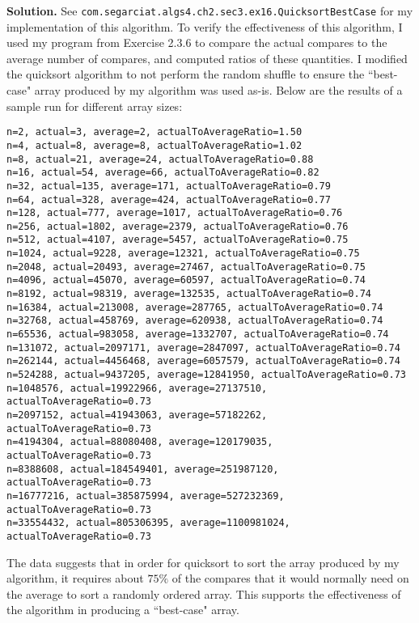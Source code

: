 \documentclass[12pt, a4paper]{article}
\newenvironment{sol}[1][Solution]
{\par\medskip\noindent \textbf{#1.} }
{\medskip}
\begin{document}
\begin{sol}
		See \texttt{com.segarciat.algs4.ch2.sec3.ex16.QuicksortBestCase} for my implementation
		of this algorithm. To verify the effectiveness of this algorithm, I used
		my program from Exercise 2.3.6 to compare the actual compares to the average
		number of compares, and computed ratios of these quantities. I modified the
		quicksort algorithm to not perform the random shuffle to ensure the ``best-case"
		array produced by my algorithm was used as-is. Below are the results of a sample
		run for different array sizes:
		\begin{lstlisting}[language={}]
n=2, actual=3, average=2, actualToAverageRatio=1.50
n=4, actual=8, average=8, actualToAverageRatio=1.02
n=8, actual=21, average=24, actualToAverageRatio=0.88
n=16, actual=54, average=66, actualToAverageRatio=0.82
n=32, actual=135, average=171, actualToAverageRatio=0.79
n=64, actual=328, average=424, actualToAverageRatio=0.77
n=128, actual=777, average=1017, actualToAverageRatio=0.76
n=256, actual=1802, average=2379, actualToAverageRatio=0.76
n=512, actual=4107, average=5457, actualToAverageRatio=0.75
n=1024, actual=9228, average=12321, actualToAverageRatio=0.75
n=2048, actual=20493, average=27467, actualToAverageRatio=0.75
n=4096, actual=45070, average=60597, actualToAverageRatio=0.74
n=8192, actual=98319, average=132535, actualToAverageRatio=0.74
n=16384, actual=213008, average=287765, actualToAverageRatio=0.74
n=32768, actual=458769, average=620938, actualToAverageRatio=0.74
n=65536, actual=983058, average=1332707, actualToAverageRatio=0.74
n=131072, actual=2097171, average=2847097, actualToAverageRatio=0.74
n=262144, actual=4456468, average=6057579, actualToAverageRatio=0.74
n=524288, actual=9437205, average=12841950, actualToAverageRatio=0.73
n=1048576, actual=19922966, average=27137510, actualToAverageRatio=0.73
n=2097152, actual=41943063, average=57182262, actualToAverageRatio=0.73
n=4194304, actual=88080408, average=120179035, actualToAverageRatio=0.73
n=8388608, actual=184549401, average=251987120, actualToAverageRatio=0.73
n=16777216, actual=385875994, average=527232369, actualToAverageRatio=0.73
n=33554432, actual=805306395, average=1100981024, actualToAverageRatio=0.73
		\end{lstlisting}
		The data suggests that in order for quicksort to sort the array produced
		by my algorithm, it requires about $75\%$ of the compares that it would
		normally need on the average to sort a randomly ordered array. This
		supports the effectiveness of the algorithm in producing a ``best-case" array.
	\end{sol}
	\pagebreak
	\printbibliography
\end{document}
